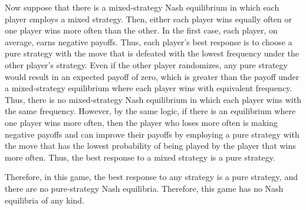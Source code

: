 \documentclass{article}
\begin{document}
Now suppose that there is a mixed-strategy Nash equilibrium in which each player employs a mixed strategy. Then, either each player wins equally often or one player wins more often than the other. In the first case, each player, on average, earns negative payoffs. Thus, each player's best response is to choose a pure strategy with the move that is defeated with the lowest frequency under the other player's strategy. Even if the other player randomizes, any pure strategy would result in an expected payoff of zero, which is greater than the payoff under a mixed-strategy equilibrium where each player wins with equivalent frequency. Thus, there is no mixed-strategy Nash equilibrium in which each player wins with the same frequency. However, by the same logic, if there is an equilibrium where one player wins more often, then the player who loses more often is making negative payoffs and can improve their payoffs by employing a pure strategy with the move that has the lowest probability of being played by the player that wins more often. Thus, the best response to a mixed strategy is a pure strategy.

Therefore, in this game, the best response to any strategy is a pure strategy, and there are no pure-strategy Nash equilibria. Therefore, this game has no Nash equilibria of any kind.


\end{document}
